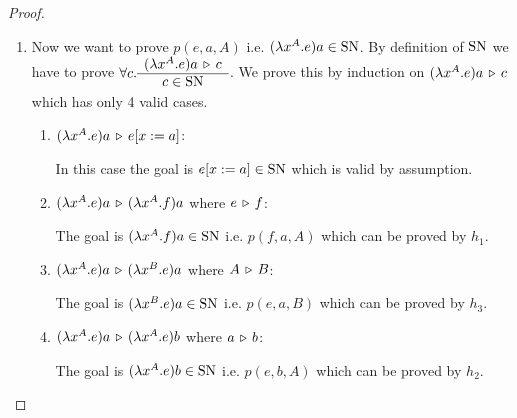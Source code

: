 \begin{lemma}
\begin{proof}
\begin{enumerate}
    \item Now we want to prove $p(e,a,A)$ i.e. $(\lambda x^A.e) a \in \text{SN}$. By
      definition of $\text{SN}$ we have to prove
      $\forall c. \begin{array}{c} (\lambda x^A. e) a \,\triangleright\, c \\ \hline c \in \text{SN}\end{array}$. We prove
      this by induction on $(\lambda x^A. e) a \,\triangleright\, c$ which has only 4
      valid cases.

      \begin{enumerate}

      \item $(\lambda x^A. e) a \,\triangleright\, e[x:=a]$:

        In this case the goal is $e[x:=a] \in \text{SN}$ which is valid by
        assumption.

      \item
        $(\lambda x^A.e) a \,\triangleright\, (\lambda x^A.f) a$ where $e \,\triangleright\, f$:

        The goal is $(\lambda x^A.f) a \in \text{SN}$ i.e. $p(f,a,A)$ which can be
        proved by $h_1$.
      \item
        $(\lambda x^A.e) a \,\triangleright\, (\lambda x^B.e) a$ where $A \,\triangleright\, B$:

        The goal is $(\lambda x^B.e) a \in \text{SN}$ i.e. $p(e,a,B)$ which can be
        proved by $h_3$.

      \item
        $(\lambda x^A.e) a \,\triangleright\, (\lambda x^A.e) b$ where $a \,\triangleright\, b$:


        The goal is $(\lambda x^A.e) b \in \text{SN}$ i.e. $p(e,b,A)$ which can be
        proved by $h_2$.
      \end{enumerate}
    \end{enumerate}
  \end{proof}
\end{lemma}




